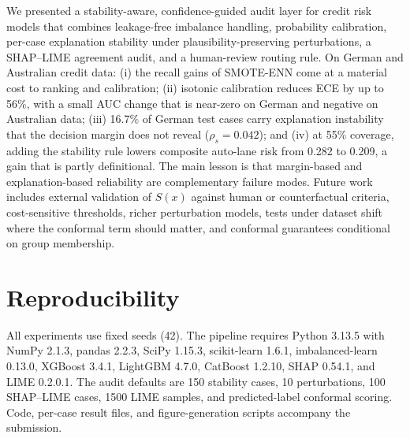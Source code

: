 \documentclass[journal]{IEEEtran}
\begin{document}
We presented a stability-aware, confidence-guided audit layer for credit risk
models that combines leakage-free imbalance handling, probability calibration,
per-case explanation stability under plausibility-preserving perturbations, a
SHAP--LIME agreement audit, and a human-review routing rule. On German and
Australian credit data: (i) the recall gains of SMOTE-ENN come at a material
cost to ranking and calibration; (ii) isotonic calibration reduces ECE by up to
56\%, with a small AUC change that is near-zero on German and negative on
Australian data; (iii) 16.7\% of German test cases carry explanation
instability that the decision margin does not reveal ($\rho_s=0.042$); and
(iv) at 55\% coverage, adding the stability rule lowers composite auto-lane
risk from 0.282 to 0.209, a gain that is partly definitional. The main lesson
is that margin-based and explanation-based reliability are complementary
failure modes. Future work includes external validation of $S(x)$ against
human or counterfactual criteria, cost-sensitive thresholds, richer
perturbation models, tests under dataset shift where the conformal term should
matter, and conformal guarantees conditional on group membership.

\section*{Reproducibility}
All experiments use fixed seeds (42). The pipeline requires Python 3.13.5 with
NumPy 2.1.3, pandas 2.2.3, SciPy 1.15.3, scikit-learn 1.6.1,
imbalanced-learn 0.13.0, XGBoost 3.4.1, LightGBM 4.7.0, CatBoost 1.2.10,
SHAP 0.54.1, and LIME 0.2.0.1. The audit defaults are 150 stability cases,
10 perturbations, 100 SHAP--LIME cases, 1500 LIME samples, and predicted-label
conformal scoring. Code, per-case result files, and figure-generation scripts
accompany the submission.
\end{document}
